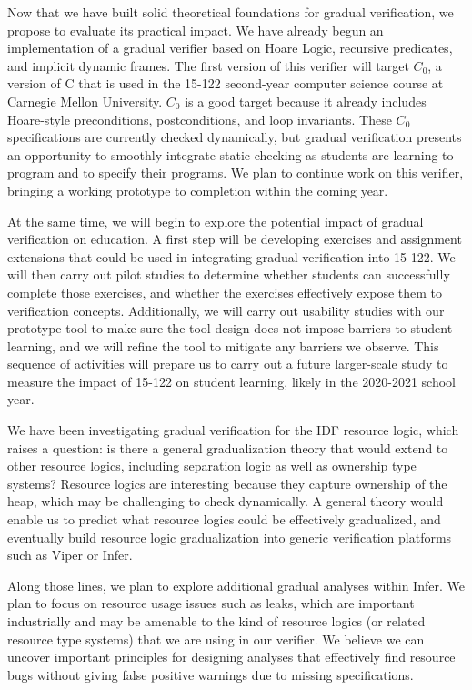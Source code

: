 \documentclass[12pt,twocolumn]{article}
\begin{document}
\begin{sloppypar}
Now that we have built solid theoretical foundations for gradual verification, we propose to evaluate its practical impact.  We have already begun an implementation of a gradual verifier based on Hoare Logic, recursive predicates, and implicit dynamic frames.  The first version of this verifier will target $C_0$, a version of C that is used in the 15-122 second-year computer science course at Carnegie Mellon University.  $C_0$ is a good target because it already includes Hoare-style preconditions, postconditions, and loop invariants.  These $C_0$ specifications are currently checked dynamically, but gradual verification presents an opportunity to smoothly integrate static checking as students are learning to program and to specify their programs.  We plan to continue work on this verifier, bringing a working prototype to completion within the coming year.

At the same time, we will begin to explore the potential impact of gradual verification on education.  A first step will be developing exercises and assignment extensions that could be used in integrating gradual verification into 15-122.  We will then carry out pilot studies to determine whether students can successfully complete those exercises, and whether the exercises effectively expose them to verification concepts.  Additionally, we will carry out usability studies with our prototype tool to make sure the tool design does not impose barriers to student learning, and we will refine the tool to mitigate any barriers we observe.  This sequence of activities will prepare us to carry out a future larger-scale study to measure the impact of 15-122 on student learning, likely in the 2020-2021 school year.

We have been investigating gradual verification for the IDF resource logic, which raises a question: is there a general gradualization theory that would extend to other resource logics, including separation logic as well as ownership type systems?  Resource logics are interesting because they capture ownership of the heap, which may be challenging to check dynamically.  A general theory would enable us to predict what resource logics could be effectively gradualized, and eventually build resource logic gradualization into generic verification platforms such as Viper or Infer.

Along those lines, we plan to explore additional gradual analyses within Infer.  We plan to focus on resource usage issues such as leaks, which are important industrially and may be amenable to the kind of resource logics (or related resource type systems) that we are using in our verifier.  We believe we can uncover important principles for designing analyses that effectively find resource bugs without giving false positive warnings due to missing specifications.


\end{sloppypar}
\end{document}
